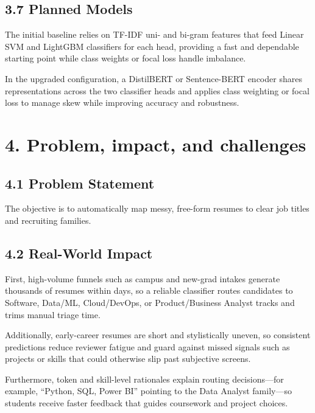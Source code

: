 \documentclass[12pt]{article}
\begin{document}
\medskip

\subsection*{3.7 Planned Models}
The initial baseline relies on TF-IDF uni- and bi-gram features that feed Linear SVM and LightGBM classifiers for each head, providing a fast and dependable starting point while class weights or focal loss handle imbalance.

In the upgraded configuration, a DistilBERT or Sentence-BERT encoder shares representations across the two classifier heads and applies class weighting or focal loss to manage skew while improving accuracy and robustness.

\medskip

\section*{4. Problem, impact, and challenges}
\subsection*{4.1 Problem Statement}
The objective is to automatically map messy, free-form resumes to clear job titles and recruiting families.

\medskip

\subsection*{4.2 Real-World Impact}
First, high-volume funnels such as campus and new-grad intakes generate thousands of resumes within days, so a reliable classifier routes candidates to Software, Data/ML, Cloud/DevOps, or Product/Business Analyst tracks and trims manual triage time.

\medskip

Additionally, early-career resumes are short and stylistically uneven, so consistent predictions reduce reviewer fatigue and guard against missed signals such as projects or skills that could otherwise slip past subjective screens.

\medskip

Furthermore, token and skill-level rationales explain routing decisions—for example, ``Python, SQL, Power BI'' pointing to the Data Analyst family—so students receive faster feedback that guides coursework and project choices.

\medskip
\end{document}
